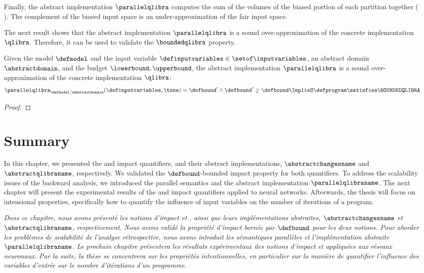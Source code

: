 {Finally, the abstract implementation $\parallelqlibra$ computes the sum of the volumes of the biased portion of each partition together (\cf{} ).
The complement of the biased input space is an under-approximation of the fair input space.

The next result shows that the abstract implementation $\parallelqlibra$ is a sound over-approximation of the concrete implementation $\qlibra$.
Therefore, it can be used to validate the $\boundedqlibra$ property.

\begin{theorem}
  Given the model $\defmodel$ and the input variable $\definputvariables\in\setof\inputvariables$, an abstract domain $\abstractdomain$, and the budget $\lowerbound, \upperbound$, the abstract implementation $\parallelqlibra$ is a sound over-approximation of the concrete implementation $\qlibra$:
  \begin{align*}
    \parallelqlibra_{\defmodel, \abstractdomain}(\definputvariables, \tune) = \defbound' \land \defbound' \ge \defbound \ImplieS \defprogram \satisfies \BOUNDEDQLIBRA
  \end{align*}
\end{theorem}
\begin{proof}
\end{proof}

} %

\section{Summary}

In this chapter, we presented the \changesname{} and \qlibraname{} impact quantifiers, and their abstract implementations, $\abstractchangesname$ and $\abstractqlibraname$, respectively.
We validated the $\defbound$-bounded impact property for both quantifiers.
To address the scalability issues of the backward analysis, we introduced the parallel semantics and the abstract implementation $\parallelqlibraname$.
The next chapter will present the experimental results of the \changesname{} and \qlibraname{} impact quantifiers applied to neural networks.
Afterwards, the thesis will focus on intensional properties, specifically how to quantify the influence of input variables on the number of iterations of a program.

\emph{Dans ce chapitre, nous avons présenté les notions d'impact \changesname{} et \qlibraname{}, ainsi que leurs implémentations abstraites, $\abstractchangesname$ et $\abstractqlibraname$, respectivement. Nous avons validé la propriété d'impact bornée par $\defbound$ pour les deux notions. Pour aborder les problèmes de scalabilité de l'analyse rétrospective, nous avons introduit les sémantiques parallèles et l'implémentation abstraite $\parallelqlibraname$. Le prochain chapitre présentera les résultats expérimentaux des notions d'impact \changesname{} et \qlibraname{} appliquées aux réseaux neuronaux. Par la suite, la thèse se concentrera sur les propriétés intentionnelles, en particulier sur la manière de quantifier l'influence des variables d'entrée sur le nombre d'itérations d'un programme.}
